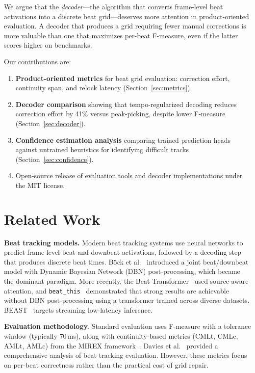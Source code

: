 \documentclass[a4paper]{article}
\begin{document}
We argue that the \textit{decoder}---the algorithm that converts frame-level beat activations
into a discrete beat grid---deserves more attention in product-oriented evaluation.
A decoder that produces a grid requiring fewer manual corrections is more valuable
than one that maximizes per-beat F-measure, even if the latter scores higher on benchmarks.

Our contributions are:
\begin{enumerate}
    \item \textbf{Product-oriented metrics} for beat grid evaluation: correction effort,
          continuity span, and relock latency (Section~\ref{sec:metrics}).
    \item \textbf{Decoder comparison} showing that tempo-regularized decoding reduces
          correction effort by 41\% versus peak-picking, despite lower F-measure (Section~\ref{sec:decoder}).
    \item \textbf{Confidence estimation analysis} comparing trained prediction heads
          against untrained heuristics for identifying difficult tracks (Section~\ref{sec:confidence}).
    \item Open-source release of evaluation tools and decoder implementations under the MIT license.
\end{enumerate}

\section{Related Work}

\textbf{Beat tracking models.}
Modern beat tracking systems use neural networks to predict frame-level beat and downbeat activations,
followed by a decoding step that produces discrete beat times.
B\"{o}ck et al.~\cite{bock2016joint} introduced a joint beat/downbeat model with Dynamic Bayesian Network (DBN)
post-processing, which became the dominant paradigm.
More recently, the Beat Transformer~\cite{beattransformer2022} used source-aware attention,
and \texttt{beat\_this}~\cite{beatthis2024} demonstrated that strong results are achievable
without DBN post-processing using a transformer trained across diverse datasets.
BEAST~\cite{beast2024} targets streaming low-latency inference.

\textbf{Evaluation methodology.}
Standard evaluation uses F-measure with a tolerance window (typically 70\,ms),
along with continuity-based metrics (CMLt, CMLc, AMLt, AMLc) from the MIREX framework~\cite{mirex}.
Davies et al.~\cite{davies2009evaluation} provided a comprehensive analysis of beat tracking evaluation.
However, these metrics focus on per-beat correctness rather than the practical cost of grid repair.
\end{document}
